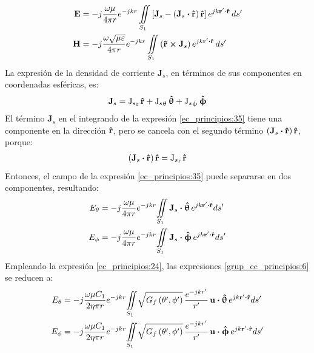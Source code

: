 \begin{subequations}
\label{grup_ec_principios:5}
\begin{align}
\mathbf{E} &= -j\frac{\omega\mu}{4\pi r}e^{- jkr}\iint\limits_{S_1}\left[\mathbf{J}_s - \left(\mathbf{J}_s\boldsymbol{\cdot}\bm{\mathbf{\hat{r}}}\right)\bm{\mathbf{\hat{r}}}\right]e^{jk\mathbf{r}'\boldsymbol{\cdot}\bm{\mathbf{\hat{r}}}}\,ds'
\label{ec_principios:35}\\
\mathbf{H} &= -j\frac{\omega\sqrt{\mu\varepsilon}}{4\pi r}e^{- jkr}\iint\limits_{S_1}\left(\bm{\mathbf{\hat{r}}}\boldsymbol{\times}\mathbf{J}_s\right)e^{jk\mathbf{r}'\boldsymbol{\cdot}\bm{\mathbf{\hat{r}}}}\,ds'
\label{ec_principios:36}
\end{align}
\end{subequations}
La expresión de la densidad de corriente $\mathbf{J}_s$, en términos de sus componentes en coordenadas esféricas, es:
\begin{align}
\mathbf{J}_s= {\text{J}_s}_{\text{r}}\,\bm{\mathbf{\hat{r}}} + {\text{J}_s}_{\uptheta}\,\bm{\mathbf{\hat{\uptheta}}} + {\text{J}_s}_{\upphi}\,\bm{\mathbf{\hat{\upphi}}}
\label{ec_principios:37}
\end{align}
El término $\mathbf{J}_s$ en el integrando de la expresión \eqref{ec_principios:35} tiene una componente en la dirección $\bm{\mathbf{\hat{r}}}$, pero se cancela con el segundo término $\left(\mathbf{J}_s\boldsymbol{\cdot}\bm{\mathbf{\hat{r}}}\right)\bm{\mathbf{\hat{r}}}$, porque:
\begin{align}
\left(\mathbf{J}_s\boldsymbol{\cdot}\bm{\mathbf{\hat{r}}}\right)\bm{\mathbf{\hat{r}}}= {\text{J}_s}_{\text{r}}\,\bm{\mathbf{\hat{r}}}
\label{ec_principios:38}
\end{align}
Entonces, el campo de la expresión \eqref{ec_principios:35} puede separarse en dos componentes, resultando:
\begin{subequations}
\label{grup_ec_principios:6}
\begin{align}
E_{\theta} &= -j\frac{\omega\mu}{4\pi r}e^{- jkr}\!\iint\limits_{S_1}\mathbf{J}_s\boldsymbol{\cdot}\bm{\mathbf{\hat{\uptheta}}}\,e^{jk\mathbf{r}'\boldsymbol{\cdot}\bm{\mathbf{\hat{r}}}}ds'
\label{ec_principios:39}\\
E_{\phi} &= -j\frac{\omega\mu}{4\pi r}e^{- jkr}\!\iint\limits_{S_1}\mathbf{J}_s\boldsymbol{\cdot}\bm{\mathbf{\hat{\upphi}}}\,e^{jk\mathbf{r}'\boldsymbol{\cdot}\bm{\mathbf{\hat{r}}}}ds'
\label{ec_principios:40}
\end{align}
\end{subequations}
Empleando la expresión \eqref{ec_principios:24}, las expresiones \eqref{grup_ec_principios:6} se reducen a:
\begin{subequations}
\label{grup_ec_principios:7}
\begin{align}
E_{\theta} &= -j\frac{\omega\mu C_1}{2\eta\pi r}e^{- jkr}\!\iint\limits_{S_1}\!\sqrt{G_f\left(\theta ',\phi '\right)}\,\frac{e^{-jkr'}}{r'}\,\mathbf{u}\boldsymbol{\cdot}\bm{\mathbf{\hat{\uptheta}}}\,e^{jk\mathbf{r}'\boldsymbol{\cdot}\bm{\mathbf{\hat{r}}}}ds'
\label{ec_principios:41}\\
E_{\phi} &= -j\frac{\omega\mu C_1}{2\eta\pi r}e^{- jkr}\!\iint\limits_{S_1}\!\sqrt{G_f\left(\theta ',\phi '\right)}\,\frac{e^{-jkr'}}{r'}\,\mathbf{u}\boldsymbol{\cdot}\bm{\mathbf{\hat{\upphi}}}\,e^{jk\mathbf{r}'\boldsymbol{\cdot}\bm{\mathbf{\hat{r}}}}ds'
\label{ec_principios:42}
\end{align}
\end{subequations}
